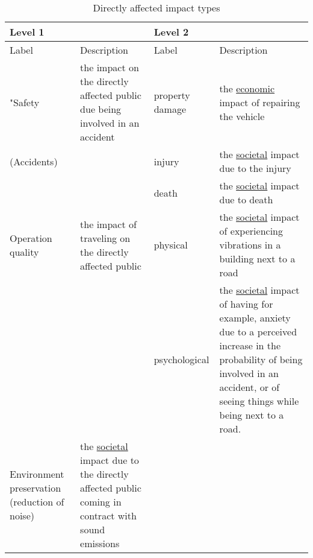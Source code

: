 \begin{table}
\caption{Directly affected impact types}
\begin{tabular}{|p{70pt}|p{100pt}|p{70pt}|p{150pt}|}
\hline
\multicolumn{2}{|l|}{Level 1} & \multicolumn{2}{l|}{Level 2} \\ 
\hline
Label & Description & Label & Description \\ 
\hline
"Safety & the impact on the directly affected public due being involved in an accident & property damage & the \underline{economic} impact of repairing the vehicle \\ 
\cline{3-4}
(Accidents) &  & injury & the \underline{societal} impact due to the injury \\ 
\cline{3-4}
 &  & death & the \underline{societal} impact due to death \\ 
\hline
Operation quality & the impact of traveling on the directly affected public & physical & the \underline{societal} impact of experiencing vibrations in a building next to a road \\ 
\cline{3-4}
 &  & psychological & the \underline{societal} impact of having for example, anxiety due to a perceived increase in the probability of being involved in an accident, or of seeing things while being next to a road. \\ 
\hline
Environment preservation (reduction of noise) & the \underline{societal} impact due to the directly affected public coming in contract with sound emissions &  &  \\ 
\hline
\end{tabular}
\label{tbl:24}
\end{table}


